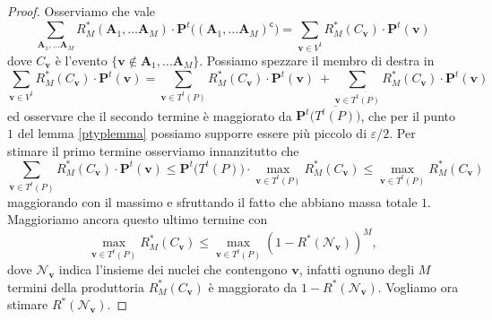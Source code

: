 \begin{proof}
	Osserviamo che vale
	\[\sum_{\mathbf{A}_{1},\dots\mathbf{A}_{M}} R_{M}^{*}(\mathbf{A}_{1},\dots\mathbf{A}_{M})\cdot\mathbf{P}^t\big((\mathbf{A}_{1},\dots\mathbf{A}_{M})^{\mathsf{c}}\big)=\sum_{\mathbf{v}\in V^{t}} R_{M}^{*}(C_{\mathbf{v}})\cdot \mathbf{P}^t(\mathbf{v})\]
	dove \(C_{\mathbf{v}}\) è l'evento \(\{\mathbf{v}\not\in \mathbf{A}_{1},\dots\mathbf{A}_{M}\}\). Possiamo spezzare il membro di destra in 
	\begin{equation}
		\label{eq:objective} \sum_{\mathbf{v}\in V^{t}} R_{M}^{*}(C_{\mathbf{v}})\cdot \mathbf{P}^t(\mathbf{v}) = \sum_{\mathbf{v}\in T^{t}(P)} R_{M}^{*}(C_{\mathbf{v}})\cdot \mathbf{P}^t(\mathbf{v})\ + \sum_{\mathbf{v}\in \overline{T^{t}(P)}} R_{M}^{*}(C_{\mathbf{v}})\cdot \mathbf{P}^t(\mathbf{v}) 
	\end{equation}
	ed osservare che il secondo termine è maggiorato da \(\mathbf{P}^t\Big(\overline{T^{t}(P)}\Big)\), che per il punto \(1\) del lemma \ref{ptyplemma} possiamo supporre essere più piccolo di \(\varepsilon/2\). Per stimare il primo termine osserviamo innanzitutto che
	\[\sum_{\mathbf{v}\in T^t(P)} R_M^{*}(C_{\mathbf{v}})\cdot \mathbf{P}^t(\mathbf{v})\le \mathbf{P}^t\big(T^t(P)\big)\cdot \max_{\mathbf{v}\in T^t(P)} R_{M}^{*}(C_{\mathbf{v}})\le \max_{\mathbf{v}\in T^t(P)} R_{M}^{*}(C_{\mathbf{v}})\]
	maggiorando con il massimo e sfruttando il fatto che abbiano massa totale \(1\). Maggioriamo ancora questo ultimo termine con
	\[\max_{\mathbf{v}\in T^t(P)} R_{M}^{*}(C_{\mathbf{v}})\le \max_{\mathbf{v}\in T^t(P)} (1-R^{*}(\mathcal{N}_{\mathbf{v}}))^{M},\]
	dove \(\mathcal{N}_{\mathbf{v}}\) indica l'insieme dei nuclei che contengono \(\mathbf{v}\), infatti ognuno degli \(M\) termini della produttoria \(R_{M}^{*}(C_{\mathbf{v}})\) è maggiorato da \(1-R^{*}(\mathcal{N}_{\mathbf{v}})\). Vogliamo ora stimare \(R^{*}(\mathcal{N}_{\mathbf{v}})\).
	

\end{proof}
